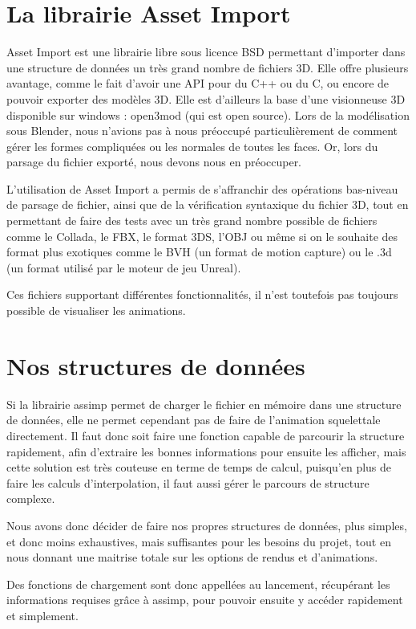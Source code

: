 \documentclass[a4paper]{report}
\begin{document}
\section{La librairie Asset Import} 
\par
Asset Import est une librairie libre sous licence BSD permettant d'importer dans une structure de données un très grand nombre de fichiers 3D. Elle offre plusieurs avantage, comme le fait d'avoir une API pour du C++ ou du C, ou encore de pouvoir exporter des modèles 3D. Elle est d'ailleurs la base d'une visionneuse 3D disponible sur windows : open3mod (qui est open source). Lors de la modélisation sous Blender, nous n'avions pas à nous préoccupé particulièrement de comment gérer les formes compliquées ou les normales de toutes les faces. Or, lors du parsage du fichier exporté, nous devons nous en préoccuper.
\par
L'utilisation de Asset Import a permis de s'affranchir des opérations bas-niveau de parsage de fichier, ainsi que de la vérification 
syntaxique du fichier 3D, tout en permettant de faire des tests avec un très grand nombre possible de 
fichiers comme le Collada, le FBX, le format 3DS, l'OBJ ou même si on le souhaite des format plus exotiques comme le BVH (un format de motion capture) ou le .3d (un format utilisé par le moteur de jeu Unreal).
\par
Ces fichiers supportant différentes fonctionnalités, il n'est toutefois pas toujours possible de visualiser les animations.

\section{Nos structures de données}
\par
Si la librairie assimp permet de charger le fichier en mémoire dans une structure de données, elle ne permet 
cependant pas de faire de l'animation squelettale directement. Il faut donc soit faire une fonction capable 
de parcourir la structure rapidement, afin d'extraire les bonnes informations pour ensuite les afficher, mais
cette solution est très couteuse en terme de temps de calcul, puisqu'en plus de faire les calculs
d'interpolation, il faut aussi gérer le parcours de structure complexe.
\par
Nous avons donc décider de faire nos propres structures de données, plus simples, et donc moins exhaustives,
mais suffisantes pour les besoins du projet, tout en nous donnant une maitrise totale sur les options de rendus et d'animations.
\par
Des fonctions de chargement sont donc appellées au lancement, récupérant les informations requises grâce à 
assimp, pour pouvoir ensuite y accéder rapidement et simplement.
\end{document}
